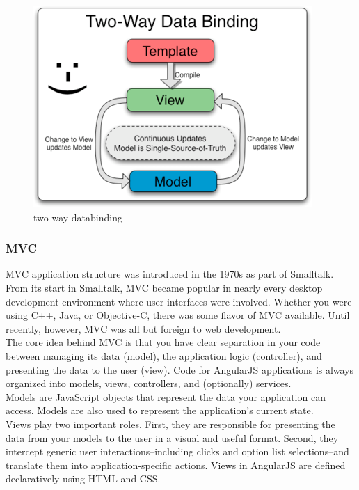 \documentclass[14pt,a4paper]{extreport}
\begin{document}
\begin{itemize}
			\begin{figure}
				\begin{center}
					\includegraphics[scale=1]{twowaybinding.png}
					\caption{two-way databinding}
					\label{fig:twowaydatabinding}
				\end{center}
			\end{figure}
			\end{itemize}
			\subsubsection{MVC}
			MVC application structure was introduced in the 1970s as part of Smalltalk\cite{AngBook}. From its start in Smalltalk, MVC became popular in nearly every desktop development environment where user interfaces were involved. Whether you were using C++, Java, or Objective-C, there was some flavor of MVC available. Until recently, however, MVC was all but foreign to web development.
\\

The core idea behind MVC is that you have clear separation in your code between managing its data (model), the application logic (controller), and presenting the data to the user (view). Code for AngularJS applications is always organized into models, views, controllers, and (optionally) services.
\\

Models are JavaScript objects that represent the data your application can access. Models are also used to represent the application's current state.
\\

Views play two important roles. First, they are responsible for presenting the data from your models to the user in a visual and useful format. Second, they intercept generic user interactions–including clicks and option list selections–and translate them into application-specific actions. Views in AngularJS are defined declaratively using HTML and CSS.
\\
\end{document}
